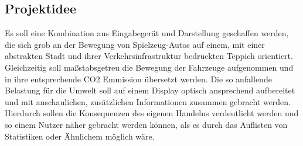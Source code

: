 \documentclass[.../Dokumentation.tex]{subfiles}
\begin{document}
\subsection{Projektidee}\label{sec-intr-idea}
Es soll eine Kombination aus Eingabegerät und Darstellung geschaffen werden, 
die sich grob an der Bewegung von Spielzeug-Autos auf einem, 
mit einer abstrakten Stadt und ihrer Verkehrsinfrastruktur bedruckten Teppich 
orientiert. Gleichzeitig soll maßstabsgetreu die Bewegung der Fahrzeuge 
aufgenommen und in ihre entsprechende CO2 Emmission übersetzt werden. 
Die so anfallende Belastung für die Umwelt soll auf einem Display 
optisch ansprechend aufbereitet und mit anschaulichen, zusätzlichen 
Informationen zusammen gebracht werden. 
Hierdurch sollen die Konsequenzen des eigenen Handelns verdeutlicht werden 
und so einem Nutzer näher gebracht werden können, als es durch das 
Auflisten von Statistiken oder Ähnlichem möglich wäre.
\end{document}
